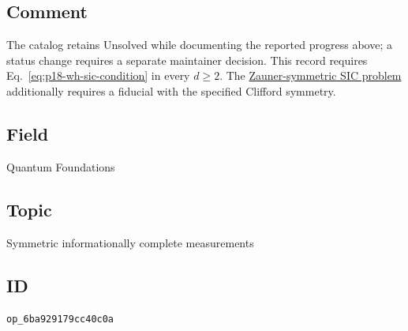 \subsection*{Comment}

The catalog retains Unsolved while documenting the reported progress above;
  a status change requires a separate maintainer decision. This record requires
  Eq.~\eqref{eq:p18-wh-sic-condition} in every $d\ge2$.
  The \href{https://qiqc-op.com/problem/op_ff2e80b425aebb86/}{Zauner-symmetric SIC problem}
  additionally requires a fiducial with the specified Clifford symmetry.

\subsection*{Field}

Quantum Foundations

\subsection*{Topic}

Symmetric informationally complete measurements

\subsection*{ID}

\texttt{op\_6ba929179cc40c0a}
